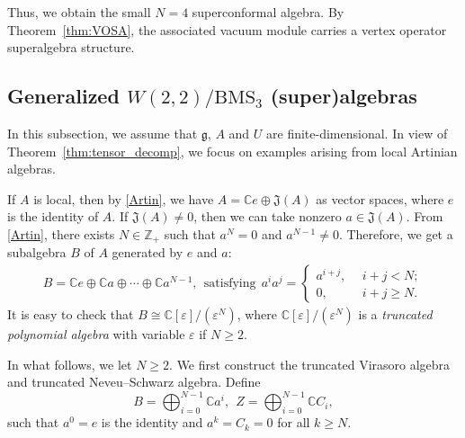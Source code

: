 \documentclass[12pt]{article}
\numberwithin{equation}{section}
\theoremstyle{definition}
\theoremstyle{plain}
\newcommand{\bC}{\ensuremath{\mathbb{C}}}
\newcommand{\bZ}{\ensuremath{\mathbb{Z}}}
\newcommand{\fg}{\mathfrak{g}}
\newcommand{\fJ}{\mathfrak{J}}
\begin{document}
Thus, we obtain the small $N=4$ superconformal algebra. By Theorem~\ref{thm:VOSA}, the associated vacuum module carries a vertex operator superalgebra structure.

\subsection{Generalized $W(2,2)/\mathrm{BMS}_3$ (super)algebras}
\hspace{1.5em}In this subsection, we assume that $\fg$, $A$ and $U$ are finite-dimensional. In view of Theorem~\ref{thm:tensor_decomp}, we focus on examples arising from local Artinian algebras. 

If $A$ is local, then by \eqref{Artin}, we have $A=\bC e\oplus \fJ(A)$ as vector spaces, where $e$ is the identity of $A$. If $\fJ(A)\neq0$, then we can take nonzero $a\in \fJ(A)$. From \eqref{Artin}, there exists $N\in\bZ_+$ such that $a^N=0$ and $a^{N-1}\neq0$. Therefore, we get a subalgebra $B$ of $A$ generated by $e$ and $a$:
\begin{gather*}
    B=\bC e\oplus \bC a\oplus\cdots \oplus\bC a^{N-1},\ \ \text{satisfying}\ \ a^i  a^j=\begin{cases}
        a^{i+j},\ \ &i+j<N;\\
        0,\ \ & i+j\ge N.
    \end{cases}
\end{gather*}
It is easy to check that $B\cong\bC[\varepsilon]/(\varepsilon^N)$, where $\bC[\varepsilon]/(\varepsilon^N)$ is a \emph{truncated polynomial algebra} with variable $\varepsilon$ if $N\ge 2$.

In what follows, we let $N\ge 2$. We first construct the truncated Virasoro algebra and truncated Neveu--Schwarz algebra. Define
\begin{equation}\label{trun.1}
    B=\bigoplus_{i=0}^{N-1}\bC a^i,\ \ Z=\bigoplus_{i=0}^{N-1}\bC C_i,
\end{equation}
such that $a^0=e$ is the identity and $a^k=C_k=0$ for all $k\ge N$.
\end{document}
